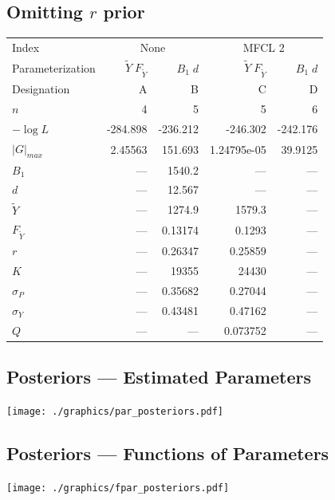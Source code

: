 \documentclass[letterpaper,KOMA,landscape,titlepage]{powersem}
\newcommand\MSY{\widetilde{Y}}
\newcommand\Fmsy{F_{\MSY}}
\newcommand\MSYFmsy{\MSY\;\Fmsy}
\newcommand\Bd{B_1\; d}
\begin{document}
\begin{slide}\section{Omitting $r$ prior}
\label{tag:ests4NOprior}
{\scriptsize
\begin{center}
\begin{tabular}{|l|rr|rr|}
\hline
Index & \multicolumn{2}{c|}{None}&\multicolumn{2}{c|}{MFCL 2}\\
\cline{2-3}\cline{4-5}
Parameterization&$\MSYFmsy$&$\Bd$&$\MSYFmsy$&$\Bd$\\
Designation& A & B& C& D\\
\hline
\hline
$n$ & 4 & 5 & 5 & 6\\
$-\log L$ & -284.898 & -236.212 & -246.302 & -242.176\\
$|G|_{max}$ & 2.45563 & 151.693 & 1.24795e-05 & 39.9125\\
\hline
$B_1$ & --- & 1540.2 & --- & ---\\
$d$ & --- & 12.567 & --- & ---\\
$\MSY$ & --- & 1274.9 & 1579.3 & ---\\
$\Fmsy$ & --- & 0.13174 & 0.1293 & ---\\
$r$ & --- & 0.26347 & 0.25859 & ---\\
$K$ & --- & 19355 & 24430 & ---\\
$\sigma_P$ & --- & 0.35682 & 0.27044 & ---\\
$\sigma_Y$ & --- & 0.43481 & 0.47162 & ---\\
$Q$ & --- & --- & 0.073752 & ---\\
\hline
\end{tabular}
\end{center} }
\end{slide}

\begin{slide}\section{Posteriors --- Estimated Parameters}
\begin{center}
\texttt{[image: ./graphics/par\_posteriors.pdf]}
\end{center}
\end{slide}

\begin{slide}\section{Posteriors --- Functions of Parameters}
\begin{center}
\texttt{[image: ./graphics/fpar\_posteriors.pdf]}
\end{center}
\end{slide}
\end{document}
